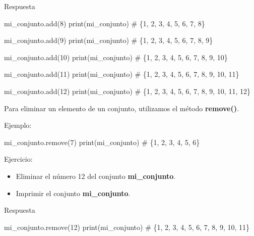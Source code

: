 \documentclass[
  a4paper,
  DIV=11,
  numbers=noendperiod,
  onepage,
  openany]{scrreprt}
\newenvironment{Shaded}{\begin{snugshade}}{\end{snugshade}}
\newcommand{\BuiltInTok}[1]{\textcolor[rgb]{0.00,0.23,0.31}{#1}}
\newcommand{\CommentTok}[1]{\textcolor[rgb]{0.37,0.37,0.37}{#1}}
\newcommand{\DecValTok}[1]{\textcolor[rgb]{0.68,0.00,0.00}{#1}}
\newcommand{\NormalTok}[1]{\textcolor[rgb]{0.00,0.23,0.31}{#1}}
\providecommand{\tightlist}{%
  \setlength{\itemsep}{0pt}\setlength{\parskip}{0pt}}\usepackage{longtable,booktabs,array}
\begin{document}
Respuesta

\begin{Shaded}
\begin{Highlighting}[]
\NormalTok{mi\_conjunto.add(}\DecValTok{8}\NormalTok{)}
\BuiltInTok{print}\NormalTok{(mi\_conjunto)  }\CommentTok{\# \{1, 2, 3, 4, 5, 6, 7, 8\}}

\NormalTok{mi\_conjunto.add(}\DecValTok{9}\NormalTok{)}
\BuiltInTok{print}\NormalTok{(mi\_conjunto)  }\CommentTok{\# \{1, 2, 3, 4, 5, 6, 7, 8, 9\}}

\NormalTok{mi\_conjunto.add(}\DecValTok{10}\NormalTok{)}
\BuiltInTok{print}\NormalTok{(mi\_conjunto)  }\CommentTok{\# \{1, 2, 3, 4, 5, 6, 7, 8, 9, 10\}}

\NormalTok{mi\_conjunto.add(}\DecValTok{11}\NormalTok{)}
\BuiltInTok{print}\NormalTok{(mi\_conjunto)  }\CommentTok{\# \{1, 2, 3, 4, 5, 6, 7, 8, 9, 10, 11\}}

\NormalTok{mi\_conjunto.add(}\DecValTok{12}\NormalTok{)}
\BuiltInTok{print}\NormalTok{(mi\_conjunto)  }\CommentTok{\# \{1, 2, 3, 4, 5, 6, 7, 8, 9, 10, 11, 12\}}
\end{Highlighting}
\end{Shaded}

Para eliminar un elemento de un conjunto, utilizamos el método
\textbf{remove()}.

Ejemplo:

\begin{Shaded}
\begin{Highlighting}[]
\NormalTok{mi\_conjunto.remove(}\DecValTok{7}\NormalTok{)}
\BuiltInTok{print}\NormalTok{(mi\_conjunto)  }\CommentTok{\# \{1, 2, 3, 4, 5, 6\}}
\end{Highlighting}
\end{Shaded}

Ejercicio:

\begin{itemize}
\tightlist
\item
  Eliminar el número 12 del conjunto \textbf{mi\_conjunto}.
\item
  Imprimir el conjunto \textbf{mi\_conjunto}.
\end{itemize}

Respuesta

\begin{Shaded}
\begin{Highlighting}[]
\NormalTok{mi\_conjunto.remove(}\DecValTok{12}\NormalTok{)}
\BuiltInTok{print}\NormalTok{(mi\_conjunto)  }\CommentTok{\# \{1, 2, 3, 4, 5, 6, 7, 8, 9, 10, 11\}}
\end{Highlighting}
\end{Shaded}
\end{document}
